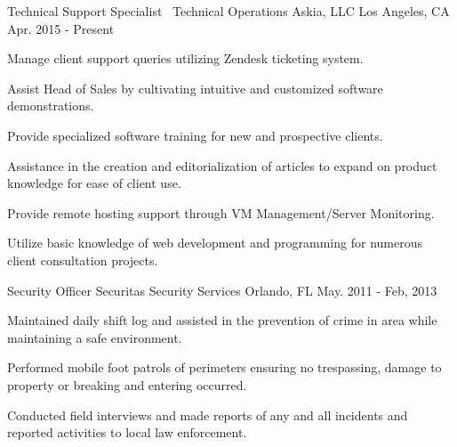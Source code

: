 


\begin{cventries}


\cventry
{Technical Support Specialist \ Technical Operations} %
{Askia, LLC} %
{Los Angeles, CA} %
{Apr. 2015 - Present} %
{ %
\begin{cvitems}
\item {Manage client support queries utilizing Zendesk ticketing system.}
\item {Assist Head of Sales by cultivating intuitive and customized software demonstrations.}
\item {Provide specialized software training for new and prospective clients.}
\item {Assistance in the creation and editorialization of articles to expand on product knowledge for ease of client use.}
\item {Provide remote hosting support through VM Management/Server Monitoring.}
\item {Utilize basic knowledge of web development and programming for numerous client consultation projects.}
\end{cvitems}
}


\cventry
{Security Officer} %
{Securitas Security Services} %
{Orlando, FL} %
{May. 2011 - Feb, 2013} %
{ %
\begin{cvitems}
\item {Maintained daily shift log and assisted in the prevention of crime in area while maintaining a safe environment.}
\item {Performed mobile foot patrols of perimeters ensuring no trespassing, damage to property or breaking and entering occurred.}
\item {Conducted field interviews and made reports of any and all incidents and reported activities to local law enforcement.}
\end{cvitems}
}

\end{cventries}